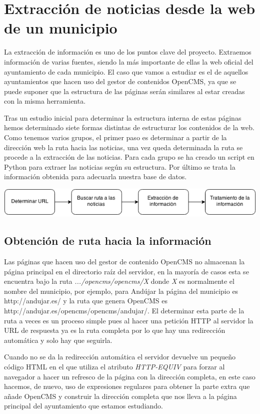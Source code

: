 
\section{Extracción de noticias desde la web de un municipio}


La extracción de información es uno de los puntos clave del proyecto. Extraemos información de varias fuentes, siendo la más importante de ellas la web oficial del ayuntamiento de cada municipio. El caso que vamos a estudiar es el de aquellos ayuntamientos que hacen uso del gestor de contenidos OpenCMS, ya que se puede suponer que la estructura de las páginas serán similares al estar creadas con la misma herramienta. 

Tras un estudio inicial para determinar la estructura interna de estas páginas hemos determinado siete formas distintas de estructurar los contenidos de la web. Como tenemos varios grupos, el primer paso es determinar a partir de la dirección web la ruta hacia las noticias, una vez queda determinada la ruta se procede a la extracción de las noticias. Para cada grupo se ha creado un script en Python para extraer las noticias según su estructura. Por último se trata la información obtenida para adecuarla nuestra base de datos.

\includegraphics[width=\textwidth]{Extraccion/imagenes/extraccion.png} 

\subsection{Obtención de ruta hacia la información}

Las páginas que hacen uso del gestor de contenido OpenCMS no almacenan la página principal en el directorio raíz del servidor, en la mayoría de casos esta se encuentra bajo la ruta  \textit{.../opencms/opencms/X} donde \textit{X} es normalmente el nombre del municipio, por ejemplo, para Andújar la página del municipio es http://andujar.es/ y la ruta que genera OpenCMS es http://andujar.es/opencms/opencms/andujar/. El determinar esta parte de la ruta a veces es un proceso simple pues al hacer una petición HTTP al servidor la URL de respuesta ya es la ruta completa por lo que hay una redirección automática y solo hay que seguirla.

Cuando no se da la redirección automática el servidor devuelve un pequeño código HTML en el que utiliza el atributo \textit{HTTP-EQUIV} para forzar al navegador a hacer un refresco de la página con la dirección completa, en este caso hacemos, de nuevo, uso de expresiones regulares para obtener la parte extra que añade OpenCMS y construir la dirección completa que nos lleva a la página principal del ayuntamiento que estamos estudiando.

